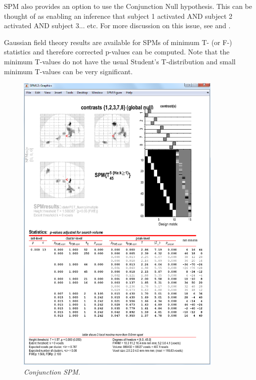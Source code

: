 SPM also provides an option to use the Conjunction Null
hypothesis. This can be thought of as enabling an inference that subject 1 activated AND subject 2 activated AND subject 3... etc. For more discussion on this issue, see
\cite{karl_conj_revisit} and \cite{tom_valid}.

Gaussian field theory results are available for SPMs of minimum T- (or F-) statistics and therefore corrected p-values can be computed.  Note that the minimum T-values do not have the usual Student's T-distribution and small minimum T-values can be very significant.
\begin{figure}
\begin{center}
\includegraphics[width=100mm]{pet/conj}
\caption{\em Conjunction SPM. \label{conj}}
\end{center}
\end{figure}

